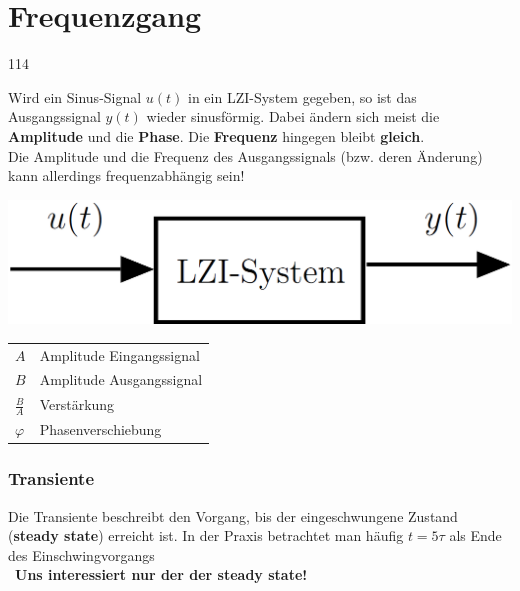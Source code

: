 \section{Frequenzgang}{114} 

Wird ein Sinus-Signal $u(t)$ in ein LZI-System gegeben, so ist das Ausgangssignal $y(t)$ wieder sinusförmig.
Dabei ändern sich meist die \textbf{Amplitude} und die \textbf{Phase}.
Die \textbf{Frequenz} hingegen bleibt \textbf{gleich}.\\
Die Amplitude und die Frequenz des Ausgangssignals (bzw. deren Änderung) kann allerdings frequenzabhängig sein!

\begin{minipage}[c]{0.48\columnwidth}
    \includegraphics[width=\columnwidth]{images/lzi_system.png}
\end{minipage}
\hfill
\begin{minipage}[c]{0.48\columnwidth}
    \begin{tabular}{ll}
        $A$             & Amplitude Eingangssignal \\
        $B$             & Amplitude Ausgangssignal \\
        $\frac{B}{A}$   & Verstärkung \\
        $\varphi$       & Phasenverschiebung \\
    \end{tabular}
\end{minipage}


\subsubsection*{Transiente}

 Die Transiente beschreibt den Vorgang, bis der eingeschwungene Zustand (\textbf{steady state}) erreicht ist.
 In der Praxis betrachtet man häufig $t = 5 \tau$ als Ende des Einschwingvorgangs \\
 \textrightarrow\ \textbf{Uns interessiert nur der der steady state!}


